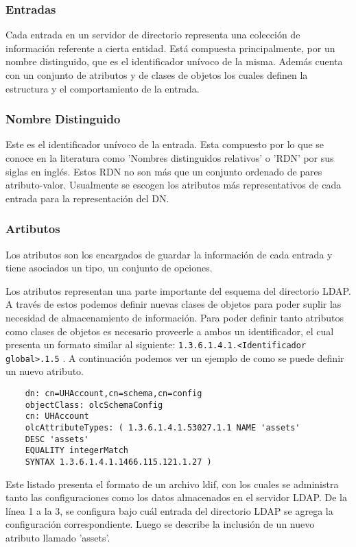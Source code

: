 \subsubsection{Entradas}
Cada entrada en un servidor de directorio representa una colección de información referente 
a cierta entidad. Está compuesta principalmente, por un nombre distinguido, que es el 
identificador unívoco de la misma. Además cuenta con un conjunto de atributos y de clases de 
objetos los cuales definen la estructura y el comportamiento de la entrada.

\subsubsection{Nombre Distinguido} 
Este es el identificador unívoco de la entrada. Esta compuesto por lo que se conoce en la 
literatura como 'Nombres distinguidos relativos' o 'RDN' por sus siglas en inglés. Estos RDN 
no son más que un conjunto ordenado de pares atributo-valor. Usualmente se escogen los 
atributos más representativos de cada entrada para la representación del DN.

\subsubsection{Artibutos}
Los atributos son los encargados de guardar la información de cada entrada y tiene asociados 
un tipo, un conjunto de opciones.

Los atributos representan una parte importante del esquema del directorio LDAP. A través de 
estos podemos definir nuevas clases de objetos para poder suplir las necesidad de 
almacenamiento de información. Para poder definir tanto atributos como clases de objetos es 
necesario proveerle a ambos un identificador, el cual presenta un formato similar al 
siguiente: \verb|1.3.6.1.4.1.<Identificador global>.1.5| . A continuación podemos ver un ejemplo de 
como se puede definir un nuevo atributo.

\newpage

\begin{lstlisting}
	dn: cn=UHAccount,cn=schema,cn=config
	objectClass: olcSchemaConfig
	cn: UHAccount
	olcAttributeTypes: ( 1.3.6.1.4.1.53027.1.1 NAME 'assets'
	DESC 'assets'
	EQUALITY integerMatch
	SYNTAX 1.3.6.1.4.1.1466.115.121.1.27 )
\end{lstlisting}

Este listado presenta el formato de un archivo ldif, con los cuales se administra tanto las 
configuraciones como los datos almacenados en el servidor LDAP. De la línea 1 a la 3, 
se configura bajo cuál entrada del directorio LDAP se agrega la configuración correspondiente.
Luego se describe la inclusión de un nuevo atributo llamado 'assets'.

